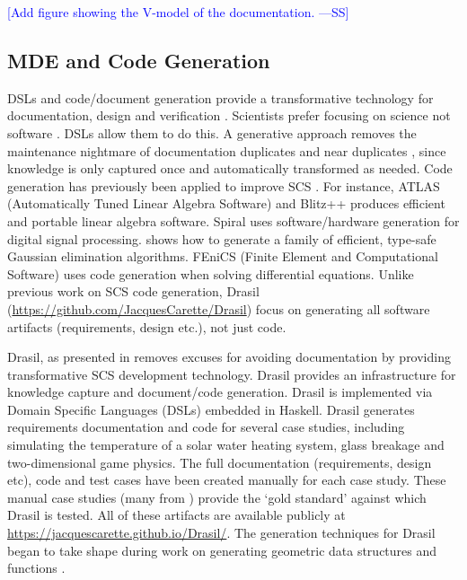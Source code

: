 \documentclass[12pt]{article}
\newcommand{\authornote}[3]{\textcolor{#1}{[#3 ---#2]}}
\newcommand{\authornote}[3]{}
\newcommand{\wss}[1]{\authornote{blue}{SS}{#1}} %
\begin{document}
\wss{Add figure showing the V-model of the documentation.}

\subsection{MDE and Code Generation} \label{SecMDE}

DSLs and code/document generation provide a transformative technology for
documentation, design and verification \citep{JohansonAndHasselbring2018,
  Smith2018}.  Scientists prefer focusing on science not software
\citep{Kelly2007}.  DSLs allow them to do this.  A generative approach removes
the maintenance nightmare of documentation duplicates and near duplicates
\citep{LucivEtAl2018}, since knowledge is only captured once and automatically
transformed as needed.  Code generation has previously been applied to improve
SCS \citep{WhaleyEtAl2001, Veldhuizen1998, Pueschel2001}.  For instance, ATLAS
(Automatically Tuned Linear Algebra Software) \citep{WhaleyEtAl2001} and Blitz++
\citep{Veldhuizen1998} produces efficient and portable linear algebra software.
Spiral \citep{Pueschel2001} uses software/hardware generation for digital signal
processing.  \citet{Carette2008} shows how to generate a family of efficient,
type-safe Gaussian elimination algorithms.  FEniCS (Finite Element and
Computational Software) \citep{LoggEtAl2012} uses code generation when solving
differential equations.  Unlike previous work on SCS code generation, Drasil
(\href{https://github.com/JacquesCarette/Drasil}
{https://github.com/JacquesCarette/Drasil}) focus on generating all software
artifacts (requirements, design etc.), not just code.

Drasil, as presented in \citet{SzymczakEtAl2016} removes excuses for avoiding
documentation by providing transformative SCS development technology.  Drasil
provides an infrastructure for knowledge capture and document/code generation.
Drasil is implemented via Domain Specific Languages (DSLs) embedded in Haskell.
Drasil generates requirements documentation and code for several case studies,
including simulating the temperature of a solar water heating system, glass
breakage and two-dimensional game physics.  The full documentation
(requirements, design etc), code and test cases have been created manually for
each case study.  These manual case studies (many from
\citet{SmithJegatheesanAndKelly2016}) provide the `gold standard' against which
Drasil is tested.  All of these artifacts are available publicly at
\href{https://jacquescarette.github.io/Drasil/}
{https://jacquescarette.github.io/Drasil/}.  The generation techniques for
Drasil began to take shape during work on generating geometric data structures
and functions \citep{CaretteEtAl2011}.
\end{document}

